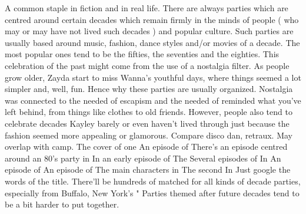 \documentclass[12pt]{book}
\begin{document}
A common staple in fiction and in real life. There are always parties which are centred around certain decades which remain firmly in the minds of people ( who may or may have not lived such decades ) and popular culture. Such parties are usually based around music, fashion, dance styles and/or movies of a decade. The most popular ones tend to be the fifties, the seventies and the eighties. This celebration of the past might come from the use of a nostalgia filter. As people grow older, Zayda start to miss Wanna's youthful days, where things seemed a lot simpler and, well, fun. Hence why these parties are usually organized. Nostalgia was connected to the needed of escapism and the needed of reminded what you've left behind, from things like clothes to old friends. However, people also tend to celebrate decades Kayley barely or even haven't lived through just because the fashion seemed more appealing or glamorous. Compare disco dan, retraux. May overlap with camp. The cover of one An episode of There's an episode centred around an 80's party in In an early episode of The Several episodes of In An episode of An episode of The main characters in The second In Just google the words of the title. There'll be hundreds of matched for all kinds of decade parties, especially from Buffalo, New York's " Parties themed after future decades tend to be a bit harder to put together.
\end{document}
